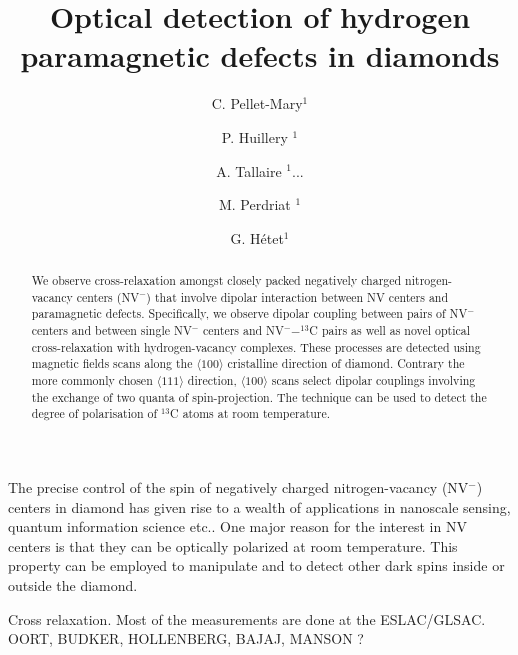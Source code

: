 \documentclass[preprintnumbers,amsmath,amssymb,twocolumn]{revtex4-1}
\begin{document}
\title{Optical detection of hydrogen paramagnetic defects in diamonds}

\author{C. Pellet-Mary$^{1}$}
\author{P. Huillery $^{1}$}
\author{A. Tallaire $^{1}$...}
\author{M. Perdriat $^{1}$}
\author{G. H\'etet$^{1}$} 


\begin{abstract}
We observe cross-relaxation amongst closely packed negatively charged nitrogen-vacancy centers (NV$^-$) that involve dipolar interaction between NV centers and paramagnetic defects. 
Specifically, we observe dipolar coupling between pairs of NV$^-$ centers and between single  NV$^-$ centers and NV$^- -^{13}$C pairs as well as novel optical cross-relaxation with hydrogen-vacancy complexes.  These processes are detected using magnetic fields scans along the $\langle 100 \rangle$ cristalline direction of diamond.
Contrary the more commonly chosen $\langle 111 \rangle$ direction, $\langle 100 \rangle$ scans select dipolar couplings involving the exchange of two quanta of spin-projection.
The technique can be used to detect the degree of polarisation of $^{13}$C atoms at room temperature.
\end{abstract}
\maketitle

The precise control of the spin of negatively charged nitrogen-vacancy (NV$^-$) centers in diamond has given rise to a wealth of applications in nanoscale sensing, quantum information science etc.. 
One major reason for the interest in NV centers is that they can be optically polarized at room temperature.  
This property can be employed to manipulate and to detect other dark spins inside or outside the diamond. 

Cross relaxation.
Most of the measurements are done at the ESLAC/GLSAC. OORT, BUDKER, HOLLENBERG, BAJAJ, MANSON ? 
\end{document}
